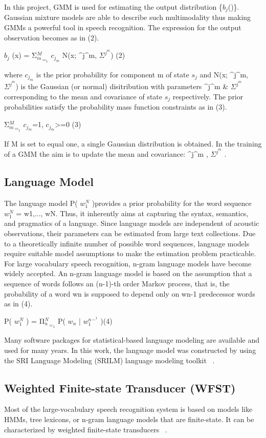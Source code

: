 \documentclass[conference]{IEEEtran}
\newcommand\tab[1][1cm]{\hspace*{#1}}
\begin{document}
In this project, GMM is used for estimating the output distribution \{$b_j$()\}. Gaussian mixture models are able to describe such multimodality thus making GMMs a powerful tool in speech recognition. The expression for the output observation becomes as in (2).

$b_j$ (x) = Σ$^M_m_=_1$ $c_j_m$ N(x; \mu^j^m, $Σ^j^m$) \tab[1.5cm](2)

where $c_j_m$ is the prior probability for component m of state $s_j$ and N(x; \mu^j^m, $Σ^j^m$) is the Gaussian (or normal) disitribution with parameters \mu^j^m \& $Σ^j^m$ corresponding to the mean and covariance of state $s_j$ respectively. The prior probabilities satisfy the probability mass function constraints as in (3).

Σ$^M_m_=_1$ $c_j_m$=1, $c_j_m$>=0 \tab[3.5cm](3)

If M is set to equal one, a single Gaussian distribution is obtained. In the training of a GMM the aim is to update the mean and covariance: \mu^j^m , $Σ^j^m$ .

\subsection{Language Model}
\label{sec:LanguageModel}

The language model P( $w_1^N$ )provides a prior probability for the word sequence $w_1^N$ = w1,..., wN. Thus, it inherently aims at capturing the syntax, semantics, and pragmatics of a language. Since language models are independent of acoustic observations, their parameters can be estimated from large text collections. Due to a theoretically infinite number of possible word sequences, language models require suitable model assumptions to make the estimation problem practicable. For large vocabulary speech recognition, n-gram language models have become widely accepted. An n-gram language model is based on the assumption that a sequence of words follows an (n-1)-th order Markov process, that is, the probability of a word wn is supposed to depend only on wn-1 predecessor words ~\cite{acmdl} as in (4).

P( $w_1^N$ ) = Π$^N_n_=_1$ P( $w_n$ | $w_1^n^-^1$ )\tab[2cm](4)

Many software packages for statistical-based language modeling are available and used for many years. In this work, the language model was constructed by using the SRI Language Modeling (SRILM) language modeling toolkit ~\cite{srilm}.


\subsection{Weighted Finite-state Transducer (WFST)}
\label{sec:WeightedFinite-stateTransducer}
Most of the large-vocabulary speech recognition system is based on models like HMMs, tree lexicons, or n-gram language models that are finite-state. It can be characterized by weighted finite-state transducers ~\cite{srec}. 
\end{document}
